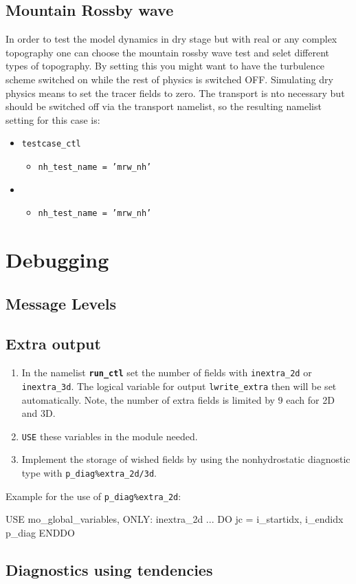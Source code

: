 \subsection{Mountain Rossby wave}
In order to test the model dynamics in dry stage but with real or any
complex topography one can choose the mountain rossby wave test and
selet different types of topography. By setting this you might want to
have the turbulence scheme switched on while the rest of physics is
switched OFF. Simulating dry physics means to set the tracer fields to
zero. The transport is nto necessary but should be switched off via
the transport namelist, so the resulting namelist setting for this case is:
\begin{itemize}
\item \texttt{testcase\_ctl}
\begin{itemize}
\item  \texttt{nh\_test\_name  = 'mrw\_nh'}
\end{itemize}

\item 
\begin{itemize}
\item  \texttt{nh\_test\_name  = 'mrw\_nh'}
\end{itemize}

\end{itemize}

\section{Debugging}

\subsection{Message Levels}

\subsection{Extra output}


\begin{enumerate} 
  \item In the namelist \textbf{\texttt{run\_ctl}} set the number of fields with \texttt{inextra\_2d} or
  \texttt{inextra\_3d}. The logical variable for output
  \texttt{lwrite\_extra} then will be set automatically. Note, the
  number of extra fields is limited by $9$ each for 2D and 3D.
\item  \texttt{USE} these variables in the module needed.
\item Implement the storage of wished fields by using the
  nonhydrostatic diagnostic type with
  \texttt{p\_diag\%extra\_2d/3d}. 
\end{enumerate} 

Example for the use of  \texttt{p\_diag\%extra\_2d}:  

\begin{fortran}  
  USE mo_global_variables, ONLY: inextra_2d
...
  DO jc = i_startidx, i_endidx
       p_diag%
  ENDDO
\end{fortran}  




\subsection{Diagnostics using tendencies}
